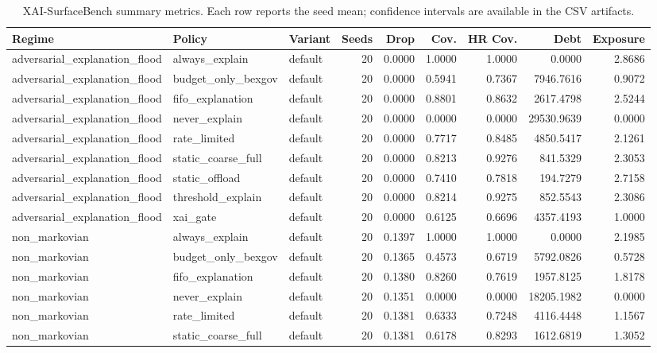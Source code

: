 \begin{table}[t]
\centering
\scriptsize
\caption{XAI-SurfaceBench summary metrics. Each row reports the seed mean; confidence intervals are available in the CSV artifacts.}
\begin{tabular}{lllrrrrrr}
\toprule
Regime & Policy & Variant & Seeds & Drop & Cov. & HR Cov. & Debt & Exposure \\
\midrule
adversarial\_explanation\_flood & always\_explain & default & 20 & 0.0000 & 1.0000 & 1.0000 & 0.0000 & 2.8686 \\
adversarial\_explanation\_flood & budget\_only\_bexgov & default & 20 & 0.0000 & 0.5941 & 0.7367 & 7946.7616 & 0.9072 \\
adversarial\_explanation\_flood & fifo\_explanation & default & 20 & 0.0000 & 0.8801 & 0.8632 & 2617.4798 & 2.5244 \\
adversarial\_explanation\_flood & never\_explain & default & 20 & 0.0000 & 0.0000 & 0.0000 & 29530.9639 & 0.0000 \\
adversarial\_explanation\_flood & rate\_limited & default & 20 & 0.0000 & 0.7717 & 0.8485 & 4850.5417 & 2.1261 \\
adversarial\_explanation\_flood & static\_coarse\_full & default & 20 & 0.0000 & 0.8213 & 0.9276 & 841.5329 & 2.3053 \\
adversarial\_explanation\_flood & static\_offload & default & 20 & 0.0000 & 0.7410 & 0.7818 & 194.7279 & 2.7158 \\
adversarial\_explanation\_flood & threshold\_explain & default & 20 & 0.0000 & 0.8214 & 0.9275 & 852.5543 & 2.3086 \\
adversarial\_explanation\_flood & xai\_gate & default & 20 & 0.0000 & 0.6125 & 0.6696 & 4357.4193 & 1.0000 \\
non\_markovian & always\_explain & default & 20 & 0.1397 & 1.0000 & 1.0000 & 0.0000 & 2.1985 \\
non\_markovian & budget\_only\_bexgov & default & 20 & 0.1365 & 0.4573 & 0.6719 & 5792.0826 & 0.5728 \\
non\_markovian & fifo\_explanation & default & 20 & 0.1380 & 0.8260 & 0.7619 & 1957.8125 & 1.8178 \\
non\_markovian & never\_explain & default & 20 & 0.1351 & 0.0000 & 0.0000 & 18205.1982 & 0.0000 \\
non\_markovian & rate\_limited & default & 20 & 0.1381 & 0.6333 & 0.7248 & 4116.4448 & 1.1567 \\
non\_markovian & static\_coarse\_full & default & 20 & 0.1381 & 0.6178 & 0.8293 & 1612.6819 & 1.3052 \\

\end{tabular}
\end{table}
